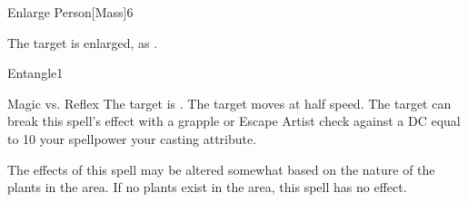 \begin{spellsection}{Enlarge Person}[Mass]{6}
    \begin{spellheader}
    \end{spellheader}
    \begin{spellcontent}
        \begin{spelltargetinginfo}
        \end{spelltargetinginfo}
        \begin{spelleffects}
            \spelleffect The target is enlarged, as .
            \spelldur \durshort \dismissable
        \end{spelleffects}
    \end{spellcontent}
    \begin{spellfooter}
        \spellnotes \sizingspellnotes
        \miscastexplode
    \end{spellfooter}
\end{spellsection}

\begin{spellsection}{Entangle}{1}
    \begin{spellheader}
    \end{spellheader}
    \begin{spellcontent}
        \begin{spelltargetinginfo}
        \end{spelltargetinginfo}
        \begin{spelleffects}
            \begin{spellattack}{Magic vs. Reflex}
                \spellsuccess The target is \immobilized.
                \spellfailure The target moves at half speed.
                \spellspecial The target can break this spell's effect with a grapple or Escape Artist check against a DC equal to 10 \add your spellpower \add your casting attribute.
            \end{spellattack}
            \spelldur \durshort
        \end{spelleffects}
    \end{spellcontent}
    \begin{spellfooter}
        \spellnotes The effects of this spell may be altered somewhat based on the nature of the plants in the area. If no plants exist in the area, this spell has no effect.
        \miscastrandom
    \end{spellfooter}
\end{spellsection}

